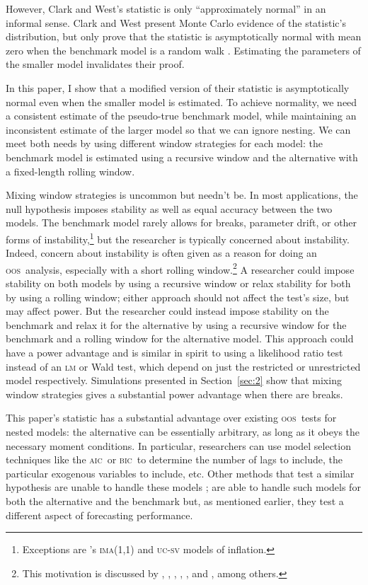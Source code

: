 \documentclass[10pt,fleqn,draft]{article}
\newcommand\citepos[2][]{\citeauthor{#2}'s \citeyearpar[#1]{#2}}
\theoremstyle{definition}
\newcommand{\aic}{\textsc{aic}}
\newcommand{\bic}{\textsc{bic}}
\newcommand{\oos}{\textsc{oos}}
\begin{document}
However, Clark and West's statistic is only ``approximately normal''
in an informal sense.  Clark and West present Monte Carlo evidence of
the statistic's distribution, but only prove that the statistic is
asymptotically normal with mean zero when the benchmark model is a
random walk \citep{ClW:06}. Estimating the parameters of the smaller
model invalidates their proof.

In this paper, I show that a modified version of their statistic is
asymptotically normal even when the smaller model is estimated.  To
achieve normality, we need a consistent estimate of the pseudo-true
benchmark model, while maintaining an inconsistent estimate of the
larger model so that we can ignore nesting.  We can meet both needs by
using different window strategies for each model: the benchmark model
is estimated using a recursive window and the alternative with a
fixed-length rolling window.

Mixing window strategies is uncommon but needn't be. In most
applications, the null hypothesis imposes stability as well as equal
accuracy between the two models.  The benchmark model rarely allows
for breaks, parameter drift, or other forms of
instability,\footnote{Exceptions are \citepos{StW:07}
  \textsc{ima}(1,1) and \textsc{uc-sv} models of inflation.} but the
researcher is typically concerned about instability.  Indeed, concern
about instability is often given as a reason for doing an \oos\
analysis, especially with a short rolling window.\footnote{This
  motivation is discussed by \citet{StW:03}, \citet{PeT:05,PeT:07},
  \cite{GiW:06}, \citet{GoW:08}, \citet{ClM:09c}, and
  \cite{GiR:09,GiR:10}, among others.} A researcher could impose
stability on both models by using a recursive window or relax
stability for both by using a rolling window; either approach should
not affect the test's size, but may affect power.  But the researcher
could instead impose stability on the benchmark and relax it for the
alternative by using a recursive window for the benchmark and a
rolling window for the alternative model.  This approach could have a
power advantage and is similar in spirit to using a likelihood ratio
test instead of an \textsc{lm} or Wald test, which depend on just the
restricted or unrestricted model respectively.  Simulations presented
in Section~\ref{sec:2} show that mixing window strategies gives a
substantial power advantage when there are breaks.

This paper's statistic has a substantial advantage over existing \oos\
tests for nested models: the alternative can be essentially arbitrary,
as long as it obeys the necessary moment conditions.  In particular,
researchers can use model selection techniques like the \aic\ or \bic\
to determine the number of lags to include, the particular exogenous
variables to include, etc.  Other methods that test a similar
hypothesis are unable to handle these models \citep[except][which does
not allow the benchmark to be estimated]{ClW:06}; \citet{GiW:06} are
able to handle such models for both the alternative and the benchmark
but, as mentioned earlier, they test a different aspect of forecasting
performance.
\end{document}
